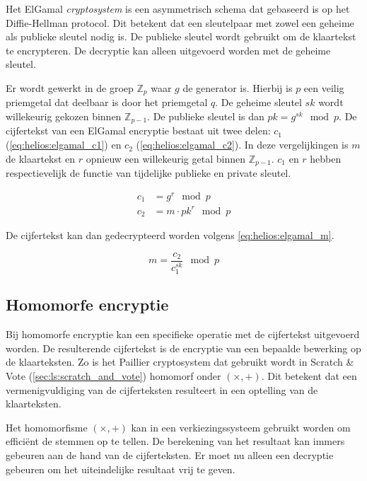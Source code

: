 Het ElGamal \textit{cryptosystem} is een asymmetrisch schema dat gebaseerd is op het Diffie-Hellman protocol. Dit betekent dat een sleutelpaar met zowel een geheime als publieke sleutel nodig is. De publieke sleutel wordt gebruikt om de klaartekst te encrypteren. De decryptie kan alleen uitgevoerd worden met de geheime sleutel.

\npar Er wordt gewerkt in de groep $\mathbb{Z}_p$ waar $g$ de generator is. Hierbij is $p$ een veilig priemgetal dat deelbaar is door het priemgetal $q$. De geheime sleutel $sk$ wordt willekeurig gekozen binnen $\mathbb{Z}_{p-1}$. De publieke sleutel is dan ${pk} = g^{sk} \mod{p}$. De cijfertekst van een ElGamal encryptie bestaat uit twee delen: $c_1$ (\ref{eq:helios:elgamal_c1}) en $c_2$ (\ref{eq:helios:elgamal_c2}). In deze vergelijkingen is $m$ de klaartekst en $r$ opnieuw een willekeurig getal binnen $\mathbb{Z}_{p-1}$. $c_1$ en $r$ hebben respectievelijk de functie van tijdelijke publieke en private sleutel.\cite{preneel_cryptography_and_network_security}

\begin{align}
  \label{eq:helios:elgamal_c1} 
  c_1 & = g^r \mod{p} \\
  \label{eq:helios:elgamal_c2}
  c_2 & = m \cdot {pk}^r \mod{p}
\end{align}

\npar De cijfertekst kan dan gedecrypteerd worden volgens \ref{eq:helios:elgamal_m}.

\begin{equation}
  \label{eq:helios:elgamal_m}
  m = \frac{c_2}{c_1^{sk}} \mod{p}
\end{equation}

\subsection{Homomorfe encryptie}
\label{sec:helios:homomorfe_encryptie}

Bij homomorfe encryptie kan een specifieke operatie met de cijfertekst uitgevoerd worden. De resulterende cijfertekst is de encryptie van een bepaalde bewerking op de klaarteksten.\cite{wiki:homomorphic_encryption} Zo is het Paillier cryptosystem dat gebruikt wordt in Scratch \& Vote (\ref{sec:ls:scratch_and_vote}) homomorf onder $(\times, +)$. Dit betekent dat een vermenigvuldiging van de cijferteksten resulteert in een optelling van de klaarteksten.

\npar Het homomorfisme $(\times, +)$ kan in een verkiezingssysteem gebruikt worden om effici\"ent de stemmen op te tellen. De berekening van het resultaat kan immers gebeuren aan de hand van de cijferteksten. Er moet nu alleen een decryptie gebeuren om het uiteindelijke resultaat vrij te geven.

